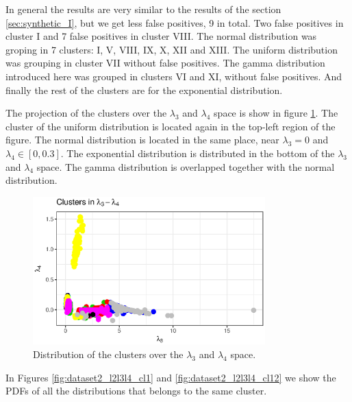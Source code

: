 In general the results are very similar to the results of the section \ref{sec:synthetic_I}, but we get less false positives, 9 in total. Two false positives in cluster I and 7 false positives in cluster VIII. The normal distribution was groping in 7 clusters: I, V, VIII, IX, X, XII and XIII. The uniform distribution was grouping in cluster VII without false positives. The gamma distribution introduced here was grouped in clusters VI and XI, without false positives. And finally the rest of the clusters are for the exponential distribution.

The projection of the clusters over the $\lambda_{3}$ and $\lambda_{4}$ space is show in figure \ref{fig:dataset2_l2l3l4_l3_l4}. The cluster of the uniform distribution is located again in the top-left region of the figure. The normal distribution is located in the same place, near $\lambda_{3} = 0$ and $\lambda_{4} \in [0, 0.3]$. The exponential distribution is distributed in the bottom of the $\lambda_{3}$ and $\lambda_{4}$ space. The gamma distribution is overlapped together with the normal distribution.

\begin{figure}[H]
    \centering
    \includegraphics[width=0.8\textwidth]{img/gld_clustering/datasetII/l2l3l4/l3_l4.eps}
    \caption{Distribution of the clusters over the $\lambda_{3}$ and $\lambda_{4}$ space.}
    \label{fig:dataset2_l2l3l4_l3_l4}
\end{figure}


In Figures \ref{fig:dataset2_l2l3l4_cl1} and \ref{fig:dataset2_l2l3l4_cl12} we show the PDFs of all the distributions that belongs to the same cluster.

